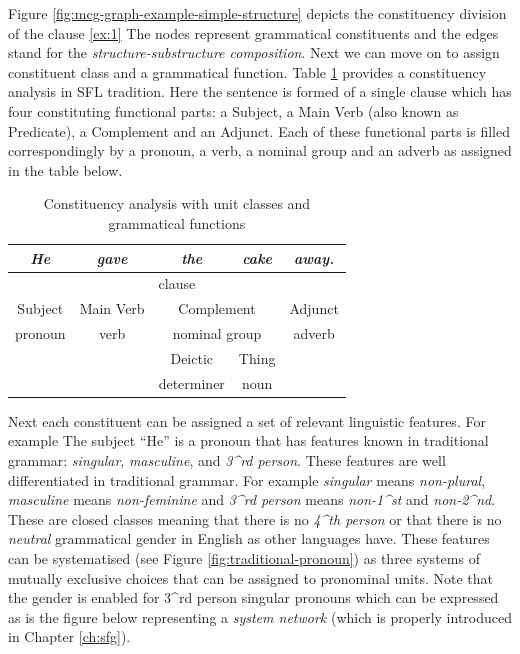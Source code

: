 Figure \ref{fig:mcg-graph-example-simple-structure} depicts the constituency division of the clause \ref{ex:1}%
The nodes represent grammatical constituents and the edges stand for the \textit{structure-substructure composition}. 
Next we can move on to assign constituent class and a grammatical function. Table \ref{tab:sfg-constituency-analisys} provides a constituency analysis in SFL tradition. Here the sentence is formed of a single clause which has four constituting functional parts: a Subject, a Main Verb (also known as Predicate), a Complement and an Adjunct. Each of these functional parts is filled correspondingly by a pronoun, a verb, a nominal group and an adverb as assigned in the table below.

\begin{table}[!ht]
    \centering
    \begin{tabular}{cc|c|c|c}
        \hline
        \multicolumn{1}{|c|}{\textit{He}} & \textit{gave} & \textit{the}     & \textit{cake}   & \multicolumn{1}{c|}{\textit{away.}} \\ \hline
        \multicolumn{5}{|c|}{clause}                                                                                                 \\ \hline
        \multicolumn{1}{|c|}{Subject}     & Main Verb     & \multicolumn{2}{c|}{Complement}    & \multicolumn{1}{c|}{Adjunct}        \\ \hline
        \multicolumn{1}{|c|}{pronoun}      & verb          & \multicolumn{2}{c|}{nominal group} & \multicolumn{1}{c|}{adverb}         \\ \hline
        &               & Deictic          & Thing           &                                     \\ \cline{3-4}
        &               & determiner       & noun            &                                     \\ \cline{3-4}
    \end{tabular}
    \caption{Constituency analysis with unit classes and grammatical functions}
    \label{tab:sfg-constituency-analisys}
\end{table}

Next each constituent can be assigned a set of relevant linguistic features. For example The subject ``He'' is a pronoun that has features known in traditional grammar: \textit{singular}, \textit{masculine}, and \textit{3^{rd} person}. These features are well differentiated in traditional grammar. For example \textit{singular} means \textit{non-plural}, \textit{masculine} means \textit{non-feminine} and \textit{3^{rd} person} means \textit{non-1^{st}} and \textit{non-2^{nd}}. These are closed classes meaning that there is no \textit{4^{th} person} or that there is no \textit{neutral} grammatical gender in English as other languages have. These features can be systematised (see Figure \ref{fig:traditional-pronoun}) as three systems of mutually exclusive choices that can be assigned to pronominal units. Note that the gender is enabled for 3^{rd} person singular pronouns which can be expressed as is the figure below representing a \textit{system network} (which is properly introduced in Chapter \ref{ch:sfg}).

